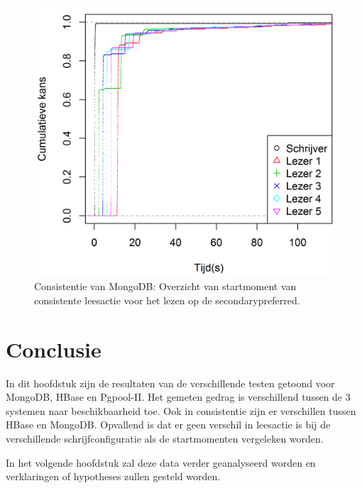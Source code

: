\begin{figure}[htb!] 
	\centering
	\includegraphics[width=.70\textwidth]{img/Observaties/MongoDB/ECDF-plot-Start-updateRawData-majority-secondarypreferred-1}
	\caption{Consistentie van MongoDB: Overzicht van startmoment van consistente leesactie voor het lezen op de secondarypreferred.  }
	\label{fig:consistentie-mongodb-secondarypreferred}
\end{figure}

\FloatBarrier
\section{Conclusie}
In dit hoofdstuk zijn de resultaten van de verschillende testen getoond voor MongoDB, HBase en Pgpool-II. Het gemeten gedrag is verschillend tussen de 3 systemen naar beschikbaarheid toe. Ook in consistentie zijn er verschillen tussen HBase en MongoDB. Opvallend is dat er geen verschil in leesactie is bij de verschillende schrijfconfiguratie als de startmomenten vergeleken worden. 

In het volgende hoofdstuk zal deze data verder geanalyseerd worden en verklaringen of hypotheses zullen gesteld worden. 